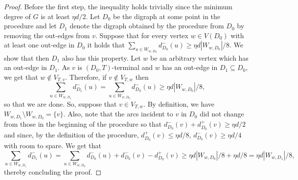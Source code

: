 \documentclass[10pt]{article}
\theoremstyle{definition}
\let\leq\leqslant
\let\geq\geqslant
\begin{document}
\begin{proof}
    Before the first step, the inequality holds trivially since the minimum degree of $G$ is at least $\eta d/2$. Let $D_0$ be the digraph at some point in the procedure and let $D_1$ denote the digraph obtained by the procedure from $D_0$ by removing the out-edges from $v$. Suppose that for every vertex $w\in V(D_0)$ with at least one out-edge in $D_0$ it holds that $\sum_{u\in W_{w,D_0}}d_{D_0}^-(u)\geq \eta d|W_{w,D_0}|/8$. We show that then $D_1$ also has this property. Let $w$ be an arbitrary vertex which has an out-edge in $D_1$.
    As $v$ is $(D_0,T)$-terminal and $w$ has an out-edge in $D_1\subseteq D_0$, we get that $w\notin V_{T,v}$. Therefore, if $v\notin V_{T,w}$ then $$
    \sum_{u\in W_{w,D_1}}d_{D_1}^-(u)=\sum_{u\in W_{w,D_0}}d_{D_0}^-(u)\geq \eta d|W_{w,D_0}|/8,
    $$
    so that we are done. So, suppose that $v\in V_{T,w}$. By definition, we have $W_{w,D_1}\setminus W_{w,D_0}=\{v\}$. Also, note that the arcs incident to $v$ in $D_0$ did not change from those in the beginning of the procedure so that $d^-_{D_0}(v)+d^+_{D_0}(v)\geq \eta d/2$ and since, by the definition of the procedure, $d^+_{D_0}(v)\leq \eta d/8$, $d^-_{D_0}(v)\geq \eta d/4$ with room to spare.
    We get that
    $$
        \sum_{u\in W_{w,D_1}}d_{D_1}^-(u)= \sum_{u\in W_{w,D_0}}d_{D_0}^-(u) + d_{D_0}^-(v)-d_{D_0}^+(v)\geq\eta d|W_{w,D_0}|/8+\eta d/8 = \eta d|W_{w,D_1}|/8,
    $$
thereby concluding the proof.
\end{proof}
\end{document}

